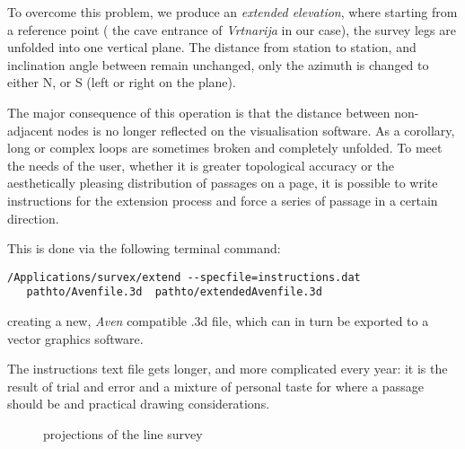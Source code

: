 To overcome this problem, we produce an \emph{extended elevation}, where starting from a reference point ( the cave entrance of \emph{Vrtnarija} in our case), the survey legs are unfolded into one vertical plane. The distance from station to station, and inclination angle between remain unchanged, only the azimuth is changed to either N, or S (left or right on the plane). 

The major consequence of this operation is that the distance between non-adjacent nodes is no longer reflected on the visualisation software. As a corollary, long or complex loops are sometimes broken and completely unfolded. To meet the needs of the user, whether it is greater topological accuracy or the aesthetically pleasing distribution of passages on a page, it is possible to write instructions for the extension process and force a series of passage in a certain direction.

 \begin{marginfigure}
 \checkoddpage \ifoddpage \forcerectofloat \else \forceversofloat \fi
 \centering
\end{marginfigure}

This is done via the following terminal command:
\begin{verbatim}
/Applications/survex/extend --specfile=instructions.dat 
   pathto/Avenfile.3d  pathto/extendedAvenfile.3d
\end{verbatim}

creating a new, \emph{Aven} compatible .3d file, which can in turn be exported to a vector graphics software.

The instructions text file gets longer, and more complicated every year: it is the result of trial and error and a mixture of personal taste for where a passage should be and practical drawing considerations. 

\begin{figure*}[t!]
 \checkoddpage \ifoddpage \forcerectofloat \else \forceversofloat \fi
\centering
{}
\caption{projections of the line survey}
\label{projection}
\end{figure*}


